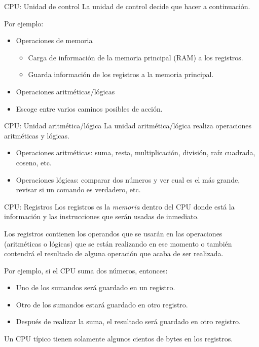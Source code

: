 \documentclass[11pt]{beamer}
\begin{document}
		\begin{frame}{CPU: Unidad de control}
			La unidad de control decide que hacer a continuación.
			
			Por ejemplo:
			\begin{itemize}
				\item Operaciones de memoria
				\begin{itemize}
					\item Carga de información de la memoria principal (RAM) a los registros.
					\item Guarda información de los registros a la memoria principal.
				\end{itemize}
				\item Operaciones aritméticas/lógicas
				\item Escoge entre varios caminos posibles de acción.
			\end{itemize}
		\end{frame}
		\begin{frame}{CPU: Unidad aritmética/lógica}
			La unidad aritmética/lógica realiza operaciones aritméticas y lógicas.
			\begin{itemize}
				\item Operaciones aritméticas: suma, resta, multiplicación, división, raíz cuadrada, coseno, etc.
				\item Operaciones lógicas: comparar dos números y ver cual es el más grande, revisar si un comando es verdadero, etc.
			\end{itemize}
		\end{frame}
		\begin{frame}{CPU: Registros}
			Los registros es la \emph{memoria} dentro del CPU donde está la información y las instrucciones que serán usadas de inmediato.
			
			Los registros contienen los operandos que se usarán en las operaciones (aritméticas o lógicas) que se están realizando en ese momento o también contendrá el resultado de alguna operación que acaba de ser realizada.
			
			Por ejemplo, si el CPU suma dos números, entonces:
			\begin{itemize}
				\item Uno de los sumandos será guardado en un registro.
				\item Otro de los sumandos estará guardado en otro registro.
				\item Después de realizar la suma, el resultado será guardado en otro registro.
			\end{itemize}
			Un CPU típico tienen solamente algunos cientos de bytes en los registros.
		\end{frame}
\end{document}
